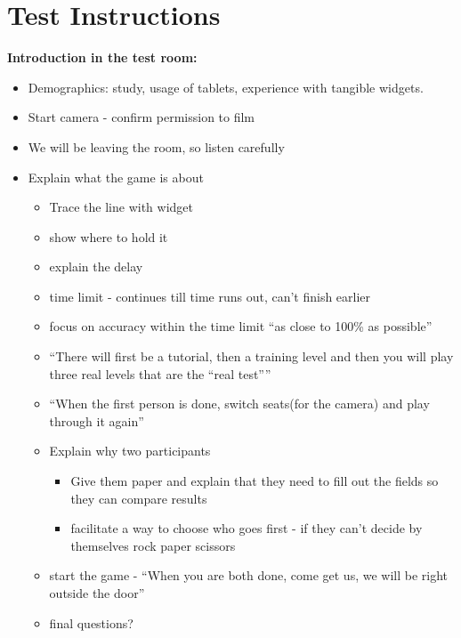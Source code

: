 \section*{Test Instructions}\label{instr}
\textbf{Introduction in the test room:}
\begin{itemize}
\item Demographics: study, usage of tablets, experience with tangible widgets.
\item Start camera - confirm permission to film
\item We will be leaving the room, so listen carefully 
\item Explain what the game is about
\begin{itemize}
\item Trace the line with widget
\item show where to hold it
\item explain the delay
\item time limit - continues till time runs out, can’t finish earlier
\item focus on accuracy within the time limit “as close to 100\% as possible”
\item “There will first be a tutorial, then a training level and then you will play three real levels that are the “real test””
\item “When the first person is done, switch seats(for the camera) and play through it again” 
\item Explain why two participants
\begin{itemize}
\item Give them paper and explain that they need to fill out the fields so they can compare results
\item facilitate a way to choose who goes first - if they can’t decide by themselves rock paper scissors
\end{itemize}
\item start the game - “When you are both done, come get us, we will be right outside the door”
\item final questions?
\end{itemize}
\end{itemize}

